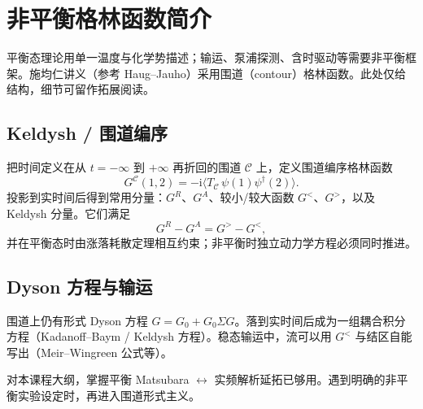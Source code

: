 \section{非平衡格林函数简介}

平衡态理论用单一温度与化学势描述；输运、泵浦探测、含时驱动等需要非平衡框架。施均仁讲义（参考 Haug--Jauho）采用围道（contour）格林函数。此处仅给结构，细节可留作拓展阅读。

\subsection{Keldysh / 围道编序}

把时间定义在从 $t=-\infty$ 到 $+\infty$ 再折回的围道 $\mathcal{C}$ 上，定义围道编序格林函数
\begin{equation}
  G^{\mathcal{C}}(1,2)
  =-\mathrm{i}
  \bigl\langle
  T_{\mathcal{C}}\,
  \psi(1)\psi^\dagger(2)
  \bigr\rangle.
\end{equation}
投影到实时间后得到常用分量：$G^{R}$、$G^{A}$、较小/较大函数 $G^{<}$、$G^{>}$，以及 Keldysh 分量。它们满足
\begin{equation}
  G^{R}-G^{A}=G^{>}-G^{<},
\end{equation}
并在平衡态时由涨落耗散定理相互约束；非平衡时独立动力学方程必须同时推进。

\subsection{Dyson 方程与输运}

围道上仍有形式 Dyson 方程 $G=G_0+G_0\Sigma G$。落到实时间后成为一组耦合积分方程（Kadanoff--Baym / Keldysh 方程）。稳态输运中，流可以用 $G^{<}$ 与结区自能写出（Meir--Wingreen 公式等）。

\begin{note}
对本课程大纲，掌握平衡 Matsubara $\leftrightarrow$ 实频解析延拓已够用。遇到明确的非平衡实验设定时，再进入围道形式主义。
\end{note}
